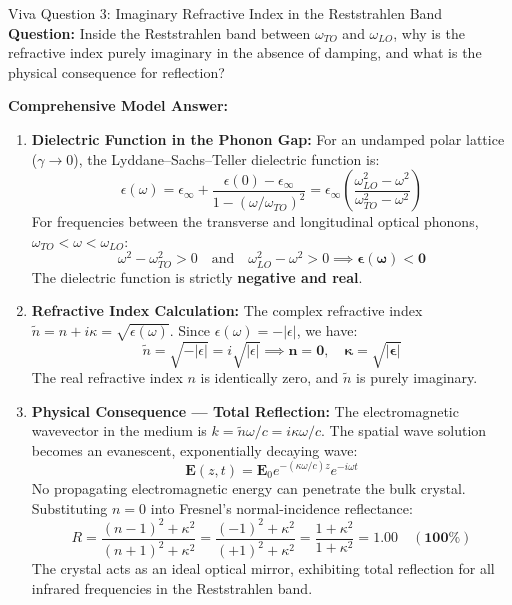 \documentclass[11pt,a4paper]{article}
\begin{document}
\begin{checkpointbox}{Viva Question 3: Imaginary Refractive Index in the Reststrahlen Band}
\textbf{Question:} Inside the Reststrahlen band between $\omega_{TO}$ and $\omega_{LO}$, why is the refractive index purely imaginary in the absence of damping, and what is the physical consequence for reflection?

\textbf{Comprehensive Model Answer:}
\begin{enumerate}[leftmargin=*]
    \item \textbf{Dielectric Function in the Phonon Gap:}
    For an undamped polar lattice ($\gamma \to 0$), the Lyddane--Sachs--Teller dielectric function is:
    \begin{equation*}
        \epsilon(\omega) = \epsilon_\infty + \frac{\epsilon(0) - \epsilon_\infty}{1 - (\omega/\omega_{TO})^2} = \epsilon_\infty \left(\frac{\omega_{LO}^2 - \omega^2}{\omega_{TO}^2 - \omega^2}\right)
    \end{equation*}
    For frequencies between the transverse and longitudinal optical phonons, $\omega_{TO} < \omega < \omega_{LO}$:
    \begin{equation*}
        \omega^2 - \omega_{TO}^2 > 0 \quad \text{and} \quad \omega_{LO}^2 - \omega^2 > 0 \implies \boldsymbol{\epsilon(\omega) < 0}
    \end{equation*}
    The dielectric function is strictly \textbf{negative and real}.
    \item \textbf{Refractive Index Calculation:}
    The complex refractive index $\tilde n = n + i\kappa = \sqrt{\epsilon(\omega)}$. Since $\epsilon(\omega) = -|\epsilon|$, we have:
    \begin{equation*}
        \tilde n = \sqrt{-|\epsilon|} = i\sqrt{|\epsilon|} \implies \boldsymbol{n = 0, \quad \kappa = \sqrt{|\epsilon|}}
    \end{equation*}
    The real refractive index $n$ is identically zero, and $\tilde n$ is purely imaginary.
    \item \textbf{Physical Consequence --- Total Reflection:}
    The electromagnetic wavevector in the medium is $k = \tilde n \omega / c = i \kappa \omega / c$. The spatial wave solution becomes an evanescent, exponentially decaying wave:
    \begin{equation*}
        \mathbf{E}(z, t) = \mathbf{E}_0 e^{-(\kappa\omega/c)z} e^{-i\omega t}
    \end{equation*}
    No propagating electromagnetic energy can penetrate the bulk crystal. Substituting $n = 0$ into Fresnel's normal-incidence reflectance:
    \begin{equation*}
        R = \frac{(n - 1)^2 + \kappa^2}{(n + 1)^2 + \kappa^2} = \frac{(-1)^2 + \kappa^2}{(+1)^2 + \kappa^2} = \frac{1 + \kappa^2}{1 + \kappa^2} = \mathbf{1.00} \quad (\mathbf{100\%})
    \end{equation*}
    The crystal acts as an ideal optical mirror, exhibiting total reflection for all infrared frequencies in the Reststrahlen band.
\end{enumerate}
\end{checkpointbox}
\end{document}
